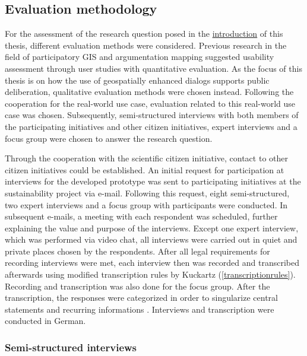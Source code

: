 \subsection{Evaluation methodology}
\label{subchap:ev_methodology}
For the assessment of the research question posed in the \hyperref[chap:introduction]{introduction} of this thesis, different evaluation methods were considered. Previous research in the field of participatory GIS and argumentation mapping suggested usability assessment through user studies with quantitative evaluation. As the focus of this thesis is on how the use of geospatially enhanced dialogs supports public deliberation, qualitative evaluation methods were chosen instead. Following the cooperation for the real-world use case, evaluation related to this real-world use case was chosen. Subsequently, semi-structured interviews with both members of the participating initiatives and other citizen initiatives, expert interviews and a focus group were chosen to answer the research question. 


Through the cooperation with the scientific citizen initiative, contact to other citizen initiatives could be established. An initial request for participation at interviews for the developed prototype was sent to participating initiatives at the sustainability project via e-mail. Following this request, eight semi-structured, two expert interviews and a focus group with  participants were conducted. In subsequent e-mails, a meeting with each respondent was scheduled, further explaining the value and purpose of the interviews. Except one expert interview, which was performed via video chat, all interviews were carried out in quiet and private places chosen by the respondents. After all legal requirements for recording interviews were met, each interview then was recorded and transcribed afterwards using modified transcription rules by Kuckartz \cite{kuckartz2007} (\ref{transcriptionrules}). Recording and transcription was also done for the focus group. After the transcription, the responses were categorized in order to singularize central statements and recurring informations \cite{naderer2007auswertung}. Interviews and transcription were conducted in German.


\subsubsection{Semi-structured interviews}

